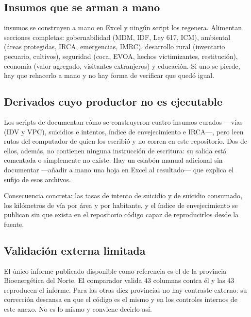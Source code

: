 \documentclass[11pt,a4paper]{article}
\begin{document}
\subsection{Insumos que se arman a mano}

\begin{hallazgo}[title={El mayor riesgo de reproducibilidad}]
\cifraCurados{} insumos se construyen a mano en Excel y ningún script los
regenera. Alimentan secciones completas: gobernabilidad (MDM, IDF, Ley 617,
ICM), ambiental (áreas protegidas, IRCA, emergencias, IMRC), desarrollo rural
(inventario pecuario, cultivos), seguridad (coca, EVOA, hechos victimizantes,
restitución), economía (valor agregado, visitantes extranjeros) y educación. Si
uno se pierde, hay que rehacerlo a mano y no hay forma de verificar que quedó
igual.
\end{hallazgo}

\subsection{Derivados cuyo productor no es ejecutable}

\begin{hallazgo}[title={Cuatro cadenas que no se pueden rehacer}]
Los scripts de  documentan cómo se
construyeron cuatro insumos curados —vías (IDV y VPC), suicidios e intentos,
índice de envejecimiento e IRCA—, pero leen rutas del computador de quien los
escribió y no corren en este repositorio. Dos de ellos, además, no contienen
ninguna instrucción de escritura: su salida está comentada o simplemente no
existe. Hay un eslabón manual adicional sin documentar —añadir a mano una hoja
 en Excel al resultado— que explica el sufijo  de esos
archivos.

Consecuencia concreta: las tasas de intento de suicidio y de suicidio consumado,
los kilómetros de vía por área y por habitante, y el índice de envejecimiento se
publican sin que exista en el repositorio código capaz de reproducirlos desde la
fuente.
\end{hallazgo}

\subsection{Validación externa limitada}

\begin{hallazgo}[title={Solo una de once provincias tiene contraste externo}]
El único informe publicado disponible como referencia es el de la provincia
Bioenergética del Norte. El comparador valida 43 columnas contra él y las 43
reproducen el informe. Para las otras diez provincias no hay contraste externo:
su corrección descansa en que el código es el mismo y en los controles internos
de este anexo. No es lo mismo y conviene decirlo así.
\end{hallazgo}
\end{document}
